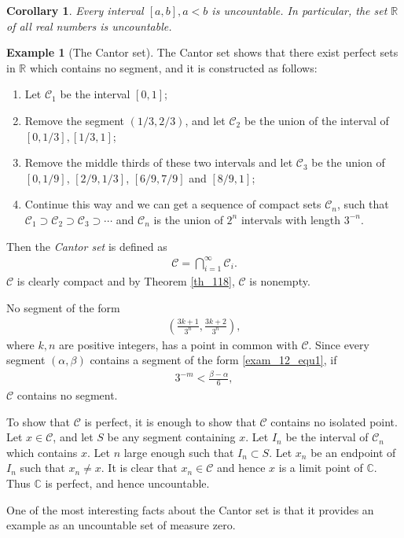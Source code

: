 \documentclass[10pt]{book}
\newtheorem{corollary}{Corollary}[theorem]
\theoremstyle{definition}
\newtheorem{example}{Example}[chapter]
\numberwithin{equation}{chapter}
\begin{document}
\medskip

\begin{corollary}
Every interval $[a,b], a < b$ is uncountable. In particular, the set $\mathbb{R}$ of all real numbers is uncountable.
\end{corollary}

\medskip

\begin{example}[The Cantor set]
The Cantor set shows that there exist perfect sets in $\mathbb{R}$ which contains no segment, and it is constructed as follows:
\begin{enumerate}[label=(\roman*)]
    \item Let $\mathcal{C}_1$ be the interval $[0,1]$;
    
    \item Remove the segment $\left(1/3,2/3\right)$, and let $\mathcal{C}_2$ be the union of the interval of $\left[0,1/3\right],\left[1/3,1\right]$;
    
    \item Remove the middle thirds of these two intervals and let $\mathcal{C}_3$ be the union of $\left[0,1/9\right]$, $\left[2/9,1/3\right]$, $\left[6/9,7/9\right]$ and $\left[8/9,1\right]$;
    
    \item Continue this way and we can get a sequence of compact sets $\mathcal{C}_n$, such that $\mathcal{C}_1\supset \mathcal{C}_2\supset \mathcal{C}_3\supset\cdots$ and $\mathcal{C}_n$ is the union of $2^n$ intervals with length $3^{-n}$.
\end{enumerate}
Then the {\em Cantor set} is defined as 
\begin{align*}
    \mathcal{C} = \bigcap^\infty_{i=1}\mathcal{C}_i.
\end{align*}
$\mathcal{C}$ is clearly compact and by Theorem \ref{th_118}, $\mathcal{C}$ is nonempty.

No segment of the form
\begin{align}\label{exam_12_equ1}
    \left(\frac{3k+1}{3^n}, \frac{3k+2}{3^n}\right),
\end{align}
where $k,n$ are positive integers, has a point in common with $\mathcal{C}$. Since every segment $(\alpha, \beta)$ contains a segment of the form \eqref{exam_12_equ1}, if 
\begin{align*}
    3^{-m} < \frac{\beta - \alpha}{6},
\end{align*}
$\mathcal{C}$ contains no segment.

To show that $\mathcal{C}$ is perfect, it is enough to show that $\mathcal{C}$ contains no isolated point. Let $x \in \mathcal{C}$, and let $S$ be any segment containing $x$. Let $I_n$ be the interval of $\mathcal{C}_n$ which contains $x$. Let $n$ large enough such that $I_n \subset S$. Let $x_n$ be an endpoint of $I_n$ such that $x_n \neq x$. It is clear that $x_n \in \mathcal{C}$ and hence $x$ is a limit point of $\mathbb{C}$. Thus $\mathbb{C}$ is perfect, and hence uncountable. 

One of the most interesting facts about the Cantor set is that it provides an example as an uncountable set of measure zero.
\end{example}
\end{document}
